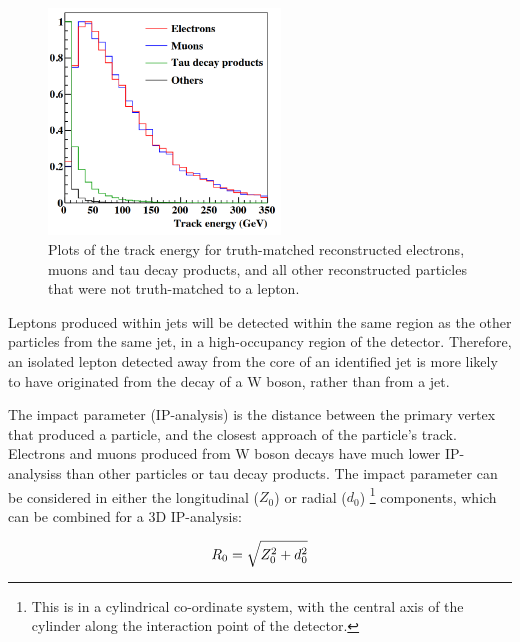 \begin{figure}[t]
	\centering
	\includegraphics[width=0.55\textwidth]{../Pictures/Analysis/track-energy.png}
	\caption{Plots of the track energy for truth-matched reconstructed electrons, muons and tau decay products, and all other reconstructed particles that were not truth-matched to a lepton.}
	\label{figure:analysis/leptons/track-energy}
\end{figure}

Leptons produced within jets will be detected within the same region as the other particles from the same jet, in a high-occupancy region of the detector. Therefore, an isolated lepton detected away from the core of an identified jet is more likely to have originated from the decay of a W boson, rather than from a jet.

The impact parameter (\acrshort{IP-analysis}) is the distance between the primary vertex that produced a particle, and the closest approach of the particle's track. Electrons and muons produced from W boson decays have much lower \acrshort{IP-analysis}s than other particles or tau decay products. The impact parameter can be considered in either the longitudinal ($Z_0$) or radial ($d_0$) \footnote{This is in a cylindrical co-ordinate system, with the central axis of the cylinder along the interaction point of the detector.} components, which can be combined for a 3D \acrshort{IP-analysis}:

\begin{equation}
	\centering
	R_0 = \sqrt{Z_0^2 + d_0^2}
\label{eq:impact-parameter}
\end{equation}

